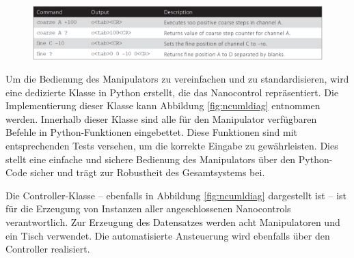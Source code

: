 \begin{figure}[h]
    \centering
    \includegraphics[width=\linewidth]{img/nc_func.png}
    \label{fig:nc_func}
\end{figure}
\newpage
Um die Bedienung des Manipulators zu vereinfachen und zu standardisieren, wird eine dedizierte Klasse in Python erstellt, die das Nanocontrol repräsentiert. Die Implementierung dieser Klasse kann Abbildung \ref{fig:ncumldiag} entnommen werden. Innerhalb dieser Klasse sind alle für den Manipulator verfügbaren Befehle in Python-Funktionen eingebettet. Diese Funktionen sind mit entsprechenden Tests versehen, um die korrekte Eingabe zu gewährleisten. Dies stellt eine einfache und sichere Bedienung des Manipulators über den Python-Code sicher und trägt zur Robustheit des Gesamtsystems bei.

Die Controller-Klasse – ebenfalls in Abbildung \ref{fig:ncumldiag} dargestellt ist – ist für die Erzeugung von Instanzen aller angeschlossenen Nanocontrols verantwortlich. Zur Erzeugung des Datensatzes werden acht Manipulatoren und ein Tisch verwendet. Die automatisierte Ansteuerung wird ebenfalls über den Controller realisiert.


